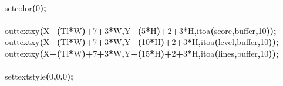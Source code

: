 \documentclass[a4paper, 10pt]{article}
\newcommand\SPC{\hspace*{0.6em}}
\newcommand{\CppAIdentifier}[1]{#1}
\newcommand{\CppANumber}[1]{\textcolor[rgb]{0.5,0,0.5}{#1}}
\newcommand{\CppASpace}[1]{\colorbox[rgb]{1,1,1}{#1}}
\newcommand{\CppASymbol}[1]{\textbf{\textcolor[rgb]{1,0,0}{#1}}}
\begin{document}
\begin{ttfamily}
\\
\CppASpace{\SPC \SPC \SPC \SPC \SPC \SPC \SPC }\CppAIdentifier{setcolor}\CppASymbol{(}\CppANumber{0}\CppASymbol{)}\CppASymbol{;}\\
\\
\CppASpace{\SPC \SPC \SPC \SPC \SPC \SPC \SPC }\CppAIdentifier{outtextxy}\CppASymbol{(}\CppAIdentifier{X}\CppASymbol{+}\CppASymbol{(}\CppAIdentifier{Tl}\CppASymbol{*}\CppAIdentifier{W}\CppASymbol{)}\CppASymbol{+}\CppANumber{7}\CppASymbol{+}\CppANumber{3}\CppASymbol{*}\CppAIdentifier{W}\CppASymbol{,}\CppAIdentifier{Y}\CppASymbol{+}\CppASymbol{(}\CppANumber{5}\CppASymbol{*}\CppAIdentifier{H}\CppASymbol{)}\CppASymbol{+}\CppANumber{2}\CppASymbol{+}\CppANumber{3}\CppASymbol{*}\CppAIdentifier{H}\CppASymbol{,}\CppAIdentifier{itoa}\CppASymbol{(}\CppAIdentifier{score}\CppASymbol{,}\CppAIdentifier{buffer}\CppASymbol{,}\CppANumber{10}\CppASymbol{)}\CppASymbol{)}\CppASymbol{;}\\
\CppASpace{\SPC \SPC \SPC \SPC \SPC \SPC \SPC }\CppAIdentifier{outtextxy}\CppASymbol{(}\CppAIdentifier{X}\CppASymbol{+}\CppASymbol{(}\CppAIdentifier{Tl}\CppASymbol{*}\CppAIdentifier{W}\CppASymbol{)}\CppASymbol{+}\CppANumber{7}\CppASymbol{+}\CppANumber{3}\CppASymbol{*}\CppAIdentifier{W}\CppASymbol{,}\CppAIdentifier{Y}\CppASymbol{+}\CppASymbol{(}\CppANumber{10}\CppASymbol{*}\CppAIdentifier{H}\CppASymbol{)}\CppASymbol{+}\CppANumber{2}\CppASymbol{+}\CppANumber{3}\CppASymbol{*}\CppAIdentifier{H}\CppASymbol{,}\CppAIdentifier{itoa}\CppASymbol{(}\CppAIdentifier{level}\CppASymbol{,}\CppAIdentifier{buffer}\CppASymbol{,}\CppANumber{10}\CppASymbol{)}\CppASymbol{)}\CppASymbol{;}\\
\CppASpace{\SPC \SPC \SPC \SPC \SPC \SPC \SPC }\CppAIdentifier{outtextxy}\CppASymbol{(}\CppAIdentifier{X}\CppASymbol{+}\CppASymbol{(}\CppAIdentifier{Tl}\CppASymbol{*}\CppAIdentifier{W}\CppASymbol{)}\CppASymbol{+}\CppANumber{7}\CppASymbol{+}\CppANumber{3}\CppASymbol{*}\CppAIdentifier{W}\CppASymbol{,}\CppAIdentifier{Y}\CppASymbol{+}\CppASymbol{(}\CppANumber{15}\CppASymbol{*}\CppAIdentifier{H}\CppASymbol{)}\CppASymbol{+}\CppANumber{2}\CppASymbol{+}\CppANumber{3}\CppASymbol{*}\CppAIdentifier{H}\CppASymbol{,}\CppAIdentifier{itoa}\CppASymbol{(}\CppAIdentifier{lines}\CppASymbol{,}\CppAIdentifier{buffer}\CppASymbol{,}\CppANumber{10}\CppASymbol{)}\CppASymbol{)}\CppASymbol{;}\\
\\
\CppASpace{\SPC \SPC \SPC \SPC \SPC \SPC \SPC }\CppAIdentifier{settextstyle}\CppASymbol{(}\CppANumber{0}\CppASymbol{,}\CppANumber{0}\CppASymbol{,}\CppANumber{0}\CppASymbol{)}\CppASymbol{;}\\

\end{ttfamily}
\end{document}
